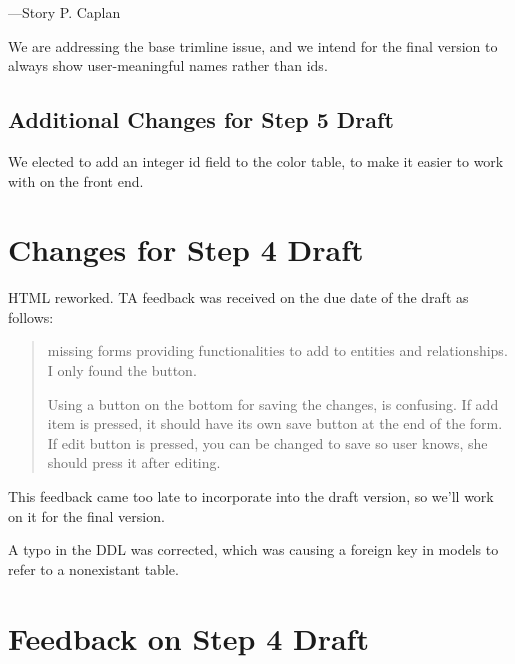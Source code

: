 \documentclass[11pt,letterpaper,oneside]{amsart}
\begin{document}
---Story P. Caplan

We are addressing the base trimline issue, and we intend for the final version to always show user-meaningful names rather than ids.

\subsection*{Additional Changes for Step 5 Draft}

We elected to add an integer id field to the color table, to make it easier to work with on the front end.


\section*{Changes for Step 4 Draft}

HTML reworked.  TA feedback was received on the due date of the draft as follows:

\begin{tcolorbox} \begin{quotation}
missing forms providing functionalities to add to entities and relationships. I only found the button.

Using a button on the bottom for saving the changes, is confusing.  If add item is pressed, it should have its own save button at the end of the form. If edit button is pressed, you can be changed to save so user knows, she should press it after editing.

\end{quotation} \end{tcolorbox}

This feedback came too late to incorporate into the draft version, so we'll work on it for the final version.

A typo in the DDL was corrected, which was causing a foreign key in models to refer to a nonexistant table.


\section*{Feedback on Step 4 Draft}
\end{document}
